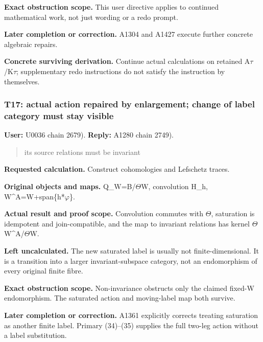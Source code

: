 \textbf{Exact obstruction scope.} This user directive applies to
continued mathematical work, not just wording or a redo prompt.

\textbf{Later completion or correction.} A1304 and A1427 execute further
concrete algebraic repairs.

\textbf{Concrete surviving derivation.} Continue actual calculations on
retained
A\allowbreak{}\ensuremath{τ}\allowbreak{}/K\allowbreak{}\ensuremath{τ}\allowbreak{};
supplementary redo instructions do not satisfy the instruction by
themselves.

\subsubsection{T17: actual action repaired by enlargement; change of
label category must stay
visible}\label{TranscriptLedgerStage:t17-actual-action-repaired-by-enlargement-change-of-label-category-must-stay-visible}

\textbf{User:} U0036
\protect{} chain 2679).
\textbf{Reply:} A1280
\protect{} chain 2749).

\begin{quote}
its source relations must be invariant
\end{quote}

\textbf{Requested calculation.} Construct cohomologies and Lefschetz
traces.

\textbf{Original objects and maps.}
Q\_W=B/\allowbreak{}\ensuremath{Θ}\allowbreak{}W, convolution H\_h,
W\textasciicircum{}A=W+span\{h*\allowbreak{}\ensuremath{φ}\allowbreak{}\}.

\textbf{Actual result and proof scope.} Convolution commutes with
\allowbreak{}\ensuremath{Θ}\allowbreak{}, saturation is idempotent and
join-compatible, and the map to invariant relations has kernel
\allowbreak{}\ensuremath{Θ}\allowbreak{}W\textasciicircum{}A/\allowbreak{}\ensuremath{Θ}\allowbreak{}W.

\textbf{Left uncalculated.} The new saturated label is usually not
finite-dimensional. It is a transition into a larger invariant-subspace
category, not an endomorphism of every original finite fibre.

\textbf{Exact obstruction scope.} Non-invariance obstructs only the
claimed fixed-W endomorphism. The saturated action and moving-label map
both survive.

\textbf{Later completion or correction.} A1361 explicitly corrects
treating saturation as another finite label. Primary (34)--(35) supplies
the full two-leg action without a label substitution.

